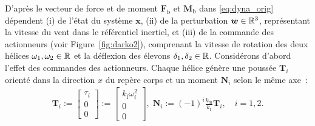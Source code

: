 D'après \cite{lustosa:hal-03035938} le vecteur de force et de moment $\boldsymbol{F}_{\text{b}}$ et $\boldsymbol{M}_{\text{b}}$ dans \eqref{eq:dyna_orig} dépendent  (i) de l'état du système $\boldsymbol{x}$, (ii) de la perturbation $\boldsymbol{w} \in {\mathbb R}^3$, représentant la vitesse du vent dans le référentiel inertiel, et (iii) de la commande des actionneurs (voir Figure~\ref{fig:darko2}), comprenant la vitesse de rotation des deux hélices $\omega_1, \omega_2 \in {\mathbb R}$ et la déflexion des élevons $\delta_1, \delta_2\in {\mathbb R}$.
Considérons d'abord l'effet des commandes des actionneurs. Chaque hélice génère une poussée $\boldsymbol{T}_i$ orienté dans la direction $x$ du repère corps et un moment $\boldsymbol{N}_i$ selon le même axe :
\begin{align}
\label{eq:thrust}
\boldsymbol{T}_{i} \!:=\! \begin{bmatrix} \tau_{i} \\ 0 \\ 0 \end{bmatrix} \!:=\!
\begin{bmatrix} k_{\text{f}}\omega_{i}^{2} \\ 0 \\ 0 \end{bmatrix}\! , \;
\boldsymbol{N}_{i} \!:=\! (-1)^{i}  \frac{k_{\text{m}} }{k_{\text{f}}}\boldsymbol{T}_{i}, \quad i=1,2 .
\end{align} 

